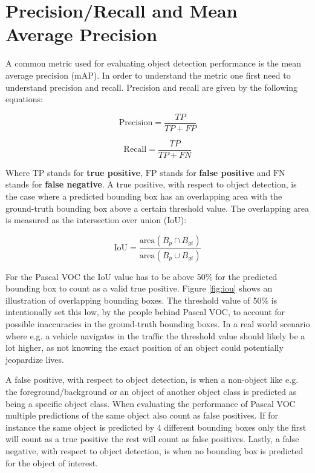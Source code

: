 \documentclass{article}
\begin{document}
\section{Precision/Recall and Mean Average Precision}
\label{sec:metrics}
A common metric used for evaluating object detection performance is the mean average precision (mAP). In order to understand the metric one first need to understand precision and recall. Precision and recall are given by the following equations:

\noindent\begin{minipage}{.5\linewidth}
\[\text{Precision}  = \frac{TP}{TP + FP}\]
\end{minipage}%
\begin{minipage}{.5\linewidth}
\[\text{Recall}  = \frac{TP}{TP + FN}\]
\end{minipage}

Where $\text{TP}$ stands for \textbf{true positive}, $\text{FP}$ stands for \textbf{false positive} and  $\text{FN}$ stands for \textbf{false negative}. A true positive, with respect to object detection, is the case where a predicted bounding box has an overlapping area with the ground-truth bounding box above a certain threshold value. The overlapping area is measured as the intersection over union (IoU):

\[\text{IoU} = \frac{\text{area}(B_{p} \cap B_{gt})}{\text{area}(B_{p} \cup B_{gt})} \]

For the Pascal VOC the IoU value has to be above 50\% for the predicted bounding box to count as a valid true positive. Figure \ref{fig:iou} shows an illustration of overlapping bounding boxes. The threshold value of 50\% is intentionally set this low, by the people behind Pascal VOC, to account for possible inaccuracies in the ground-truth bounding boxes. In a real world scenario where e.g. a vehicle navigates in the traffic the threshold value should likely be a lot higher, as not knowing the exact position of an object could potentially jeopardize lives.

A false positive, with respect to object detection, is when a non-object like e.g. the foreground/background or an object of another object class is predicted as being a specific object class. When evaluating the performance of Pascal VOC multiple predictions of the same object also count as false positives. If for instance the same object is predicted by 4 different bounding boxes only the first will count as a true positive the rest will count as false positives. Lastly, a false negative, with respect to object detection, is when no bounding box is predicted for the object of interest. 
\end{document}
